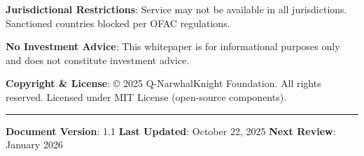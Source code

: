 \documentclass[
  11pt,
]{article}
\begin{document}
\textbf{Jurisdictional Restrictions}: Service may not be available in
all jurisdictions. Sanctioned countries blocked per OFAC regulations.

\textbf{No Investment Advice}: This whitepaper is for informational
purposes only and does not constitute investment advice.

\textbf{Copyright \& License}: © 2025 Q-NarwhalKnight Foundation. All
rights reserved. Licensed under MIT License (open-source components).

\begin{center}\rule{0.5\linewidth}{0.5pt}\end{center}

\textbf{Document Version}: 1.1 \textbf{Last Updated}: October 22, 2025
\textbf{Next Review}: January 2026
\end{document}
